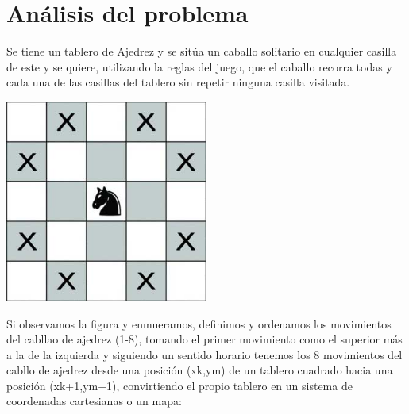 \documentclass[a4paper, 11pt]{article}
\begin{document}

\renewcommand{\abstractname}{Resumen} %


\color{darkGray}
{\parskip=2pt
  \tableofcontents
}
\pagebreak

\section{Análisis del problema}



Se tiene un  tablero de Ajedrez y se sitúa un caballo solitario en cualquier casilla de este y se quiere, utilizando la reglas del juego, que el caballo recorra todas y cada una de las casillas del tablero sin repetir ninguna casilla visitada.

	\includegraphics[width=0.5\textwidth]{cover.jpg}
		
				Si observamos la figura y enmueramos, definimos y ordenamos los movimientos del cabllao de ajedrez (1-8), tomando el primer movimiento como el superior más a la de la izquierda y siguiendo un sentido horario tenemos los 8 movimientos del cabllo de ajedrez desde una posición (xk,ym) de un tablero cuadrado hacia una posición (xk+1,ym+1), convirtiendo el propio tablero en un sistema de coordenadas cartesianas o un mapa:
			
\end{document}
